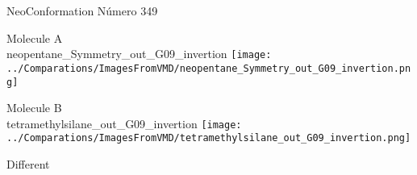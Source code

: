  \newpage

\vtab[-2cm]
\begin{center}
{\large NeoConformation \tab Número 349}
\end{center}
\begin{multicols}{2}
\begin{center}
Molecule A \\ 
neopentane\_Symmetry\_out\_G09\_invertion
\texttt{[image: ../Comparations/ImagesFromVMD/neopentane\_Symmetry\_out\_G09\_invertion.png]}
\\
\vtab

\columnbreak
Molecule B \\ 
tetramethylsilane\_out\_G09\_invertion
\texttt{[image: ../Comparations/ImagesFromVMD/tetramethylsilane\_out\_G09\_invertion.png]}
\\
\vtab


\end{center}
\end{multicols}
\begin{center}
\vtab
\vtab
\textcolor{NavyBlue}{\Large Different}
\end{center}

 \newpage


